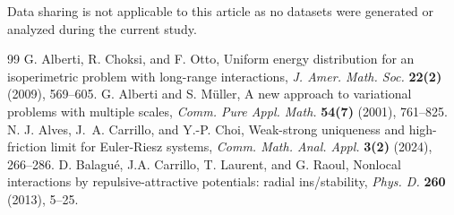 \documentclass[reqno,11pt]{amsart}
\numberwithin{equation}{section}
\theoremstyle{definition}
\begin{document}
\bigskip
{} Data sharing is not applicable to this article as no datasets were generated or analyzed during the current study.

\begin{thebibliography}{99}
G. Alberti, R. Choksi, and F. Otto, 
Uniform energy distribution for an isoperimetric problem with long-range interactions, 
{\em J. Amer. Math. Soc.} {\bf 22(2)}(2009), 569--605.
 G. Alberti and S. Müller,
 A new approach to variational problems with multiple scales,
 {\em Comm. Pure Appl. Math.} {\bf 54(7)} (2001), 761--825.
 N. J. Alves, J.~A. Carrillo, and Y.-P. Choi,
 Weak-strong uniqueness and high-friction limit for Euler-Riesz systems,
 {\em Comm. Math. Anal. Appl.} {\bf 3(2)} (2024), 266--286.
 D. Balagu\'{e}, J.A. Carrillo, T. Laurent, and G. Raoul,
 Nonlocal interactions by repulsive-attractive potentials: radial ins/stability, {\em Phys. D.} {\bf 260} (2013), 5--25.


\end{thebibliography}
\end{document}
